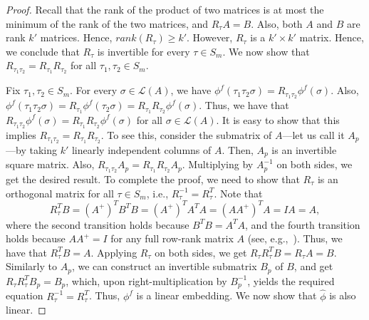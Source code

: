 \documentclass[prodmode,acmec]{ec-acmsmall}
\newcommand{\calL}{{\mathcal{L}}}
\newcommand{\rank}{{\calL(A)}}
\begin{document}
\begin{proof}
Recall that the rank of the product of two matrices is at most the minimum of the rank of the two matrices, and $R_{\tau} A = B$. Also, both $A$ and $B$ are rank $k'$ matrices. Hence, $rank(R_{\tau}) \ge k'$. However, $R_{\tau}$ is a $k' \times k'$ matrix. Hence, we conclude that $R_{\tau}$ is invertible for every $\tau \in S_m$. We now show that $R_{\tau_1 \tau_2} = R_{\tau_1} R_{\tau_2}$ for all $\tau_1,\tau_2 \in S_m$. 

Fix $\tau_1,\tau_2 \in S_m$. For every $\sigma \in \rank$, we have $\phi^f(\tau_1 \tau_2 \sigma) = R_{\tau_1 \tau_2} \phi^f(\sigma)$. Also, $\phi^f(\tau_1 \tau_2 \sigma) = R_{\tau_1} \phi^f(\tau_2 \sigma) = R_{\tau_1}R_{\tau_2} \phi^f(\sigma)$. Thus, we have that $R_{\tau_1 \tau_2} \phi^f(\sigma) = R_{\tau_1} R_{\tau_2} \phi^f(\sigma)$ for all $\sigma \in \rank$. It is easy to show that this implies $R_{\tau_1 \tau_2} = R_{\tau_1} R_{\tau_2}$. To see this, consider the submatrix of $A$---let us call it $A_p$---by taking $k'$ linearly independent columns of $A$. Then, $A_p$ is an invertible square matrix. Also, $R_{\tau_1 \tau_2} A_p = R_{\tau_1} R_{\tau_2} A_p$. Multiplying by $A_p^{-1}$ on both sides, we get the desired result. To complete the proof, we need to show that $R_{\tau}$ is an orthogonal matrix for all $\tau \in S_m$, i.e., $R_{\tau}^{-1} = R_{\tau}^T$. Note that 
$$
R_{\tau}^T B = (A^{+})^T B^T B = (A^{+})^T A^T A = (A A^{+})^T A = I A = A,
$$
where the second transition holds because $B^T B = A^T A$, and the fourth transition holds because $A A^{+} = I$ for any full row-rank matrix $A$ (see, e.g.,~\cite{BH12}). Thus, we have that $R_{\tau}^T B = A$. Applying $R_{\tau}$ on both sides, we get $R_{\tau} R_{\tau}^T B = R_{\tau} A = B$. Similarly to $A_p$, we can construct an invertible submatrix $B_p$ of $B$, and get $R_{\tau} R_{\tau}^T B_p = B_p$, which, upon right-multiplication by $B_p^{-1}$, yields the required equation $R_{\tau}^{-1} = R_{\tau}^T$. Thus, $\phi^f$ is a linear embedding. We now show that $\hat{\phi}$ is also linear. 


\end{proof}
\end{document}
